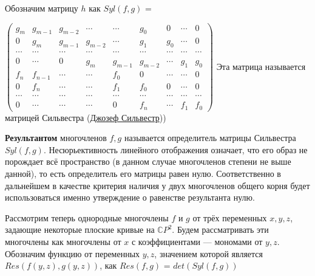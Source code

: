 \documentclass[a4paper, 12pt]{article}
\begin{document}
\smallskip
Обозначим матрицу $h$ как $Syl(f,g)$ =

\smallskip
$\begin{pmatrix}
g_m & g_{m-1} & g_{m-2} & \cdots & \cdots & g_0 & 0 & \cdots & 0 \\
0 & g_m & g_{m-1} & g_{m-2} & \cdots & g_1 & g_0 & \cdots & 0 \\
\cdots & \cdots & \cdots & \cdots & \cdots & \cdots & \cdots & \cdots & \cdots \\
0 & \cdots & 0 & g_m & g_{m-1} & g_{m-2} & \cdots & g_1 & g_0 \\
f_n & f_{n-1} & \cdots & \cdots & f_0 & 0 & \cdots & \cdots & 0 \\
0 & f_n & \cdots & \cdots & f_1 & f_0 & 0 & \cdots & 0 \\
\cdots & \cdots & \cdots & \cdots & \cdots & \cdots & \cdots & \cdots & \cdots \\
0 & \cdots & \cdots & \cdots & 0 & f_n & \cdots & f_1 & f_0
\end{pmatrix}$
\newline
Эта матрица называется матрицей Сильвестра (\href{https://ru.wikipedia.org/wiki/%D0%A1%D0%B8%D0%BB%D1%8C%D0%B2%D0%B5%D1%81%D1%82%D1%80,_%D0%94%D0%B6%D0%B5%D0%B9%D0%BC%D1%81_%D0%94%D0%B6%D0%BE%D0%B7%D0%B5%D1%84}{Джозеф Сильвестр}))

\textbf{Результантом} многочленов $f,g$ называется определитель матрицы Сильвестра $Syl(f,g)$.\newline
\newline
Несюрьективность линейного отображения означает, что его образ не порождает всё пространство (в данном случае многочленов степени не выше данной), то есть определитель его матрицы равен нулю. Соответственно в дальнейшем в качестве критерия наличия у двух многочленов общего корня будет использоваться именно утверждение о равенстве результанта нулю.\newline\bigskip

Рассмотрим теперь однородные многочлены $f$ и $g$ от трёх переменных $x,y,z$, задающие некоторые плоские кривые на $\mathbb{C}P^2$.\newline
Будем рассматривать эти многочлены как многочлены от $x$ с коэффициентами --- мономами от $y,z$.\newline
Обозначим функцию от переменных $y,z$, значением которой является\newline $Res(f(y,z),g(y,z))$, как $Res(f,g)$ = $det(Syl(f,g))$\newline
\end{document}
